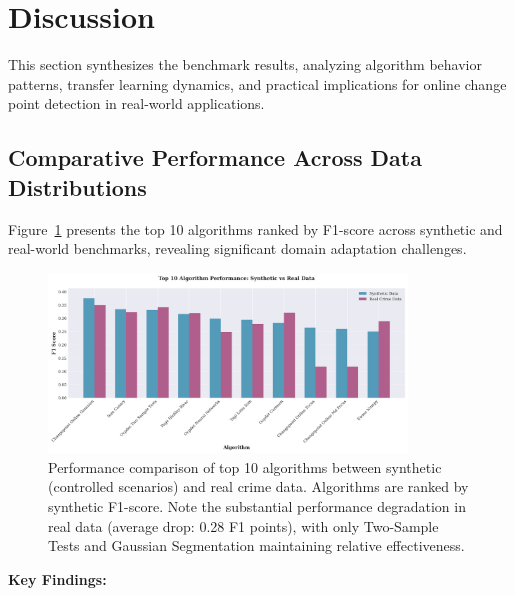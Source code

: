 \section{Discussion}

This section synthesizes the benchmark results, analyzing algorithm behavior patterns, transfer learning dynamics, and practical implications for online change point detection in real-world applications.

\subsection{Comparative Performance Across Data Distributions}

Figure~\ref{fig:top_algorithms_comparison} presents the top 10 algorithms ranked by F1-score across synthetic and real-world benchmarks, revealing significant domain adaptation challenges.

\begin{figure}[H]
\centering
\includegraphics[width=0.85\textwidth]{figures/fig_top_algorithms_comparison.png}
\caption{Performance comparison of top 10 algorithms between synthetic (controlled scenarios) and real crime data. Algorithms are ranked by synthetic F1-score. Note the substantial performance degradation in real data (average drop: 0.28 F1 points), with only Two-Sample Tests and Gaussian Segmentation maintaining relative effectiveness.}
\label{fig:top_algorithms_comparison}
\end{figure}

\textbf{Key Findings:}

